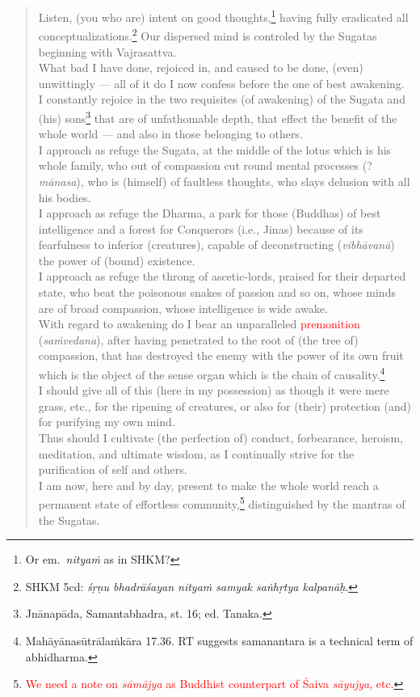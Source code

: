 \documentclass[11pt]{book}
\newcommand{\red}[1]{\textcolor{red}{#1}}
\newcommand{\skt}[1]{\emph{#1}}
\begin{document}
\begin{verse}
Listen, (you who are) intent on good thoughts,\footnote{Or em.\ \skt{nityaṁ} as in SHKM?} having fully eradicated all conceptualizations.\footnote{SHKM 5cd: \skt{śṛṇu bhadrāśayan nityaṁ samyak saṅhṛtya kalpanāḥ}.} Our dispersed mind is controled by the Sugatas beginning with Vajrasattva.\\
	What bad I have done, rejoiced in, and caused to be done, (even) unwittingly — all of it do I now confess before the one of best awakening.\\
	I constantly rejoice in the two requisites (of awakening) of the Sugata and (his) sons\footnote{Jnānapāda, Samantabhadra, st. 16; ed. Tanaka.} that are of unfathomable depth, that effect the benefit of the whole world — and also in those belonging to others.\\
	I approach as refuge the Sugata, at the middle of the lotus which is his whole family, who out of compassion cut round mental processes (? \skt{mānasa}), who is (himself) of faultless thoughts, who slays delusion with all his bodies.\\
	I approach as refuge the Dharma, a park for those (Buddhas) of best intelligence and a forest for Conquerors (i.e., Jinas) because of its fearfulness to inferior (creatures), capable of deconstructing (\skt{vibhāvanā}) the power of (bound) existence.\\
	I approach as refuge the throng of ascetic-lords, praised for their departed state, who beat the poisonous snakes of passion and so on, whose minds are of broad compassion, whose intelligence is wide awake.\\
	With regard to awakening do I bear an unparalleled \red{premonition} (\skt{saṁvedana}), after having penetrated to the root of (the tree of) compassion, that has destroyed the enemy with the power of its own fruit which is the object of the sense organ which is the chain of causality.\footnote{Mahāyānasūtrālaṁkāra 17.36. RT suggests samanantara is a technical term of abhidharma.}\\
	I should give all of this (here in my possession) as though it were mere grass, etc., for the ripening of creatures, or also for (their) protection (and) for purifying my own mind.\\
	Thus should I cultivate (the perfection of) conduct, forbearance, heroism, meditation, and ultimate wisdom, as I continually strive for the purification of self and others.\\
	I am now, here and by day, present to make the whole world reach a permanent state of effortless  %
	community,\footnote{\red{We need a note on \skt{sāmājya} as Buddhist counterpart of Śaiva \skt{sāyujya}, etc.}} distinguished by the mantras of the Sugatas.
\end{verse}
\end{document}

